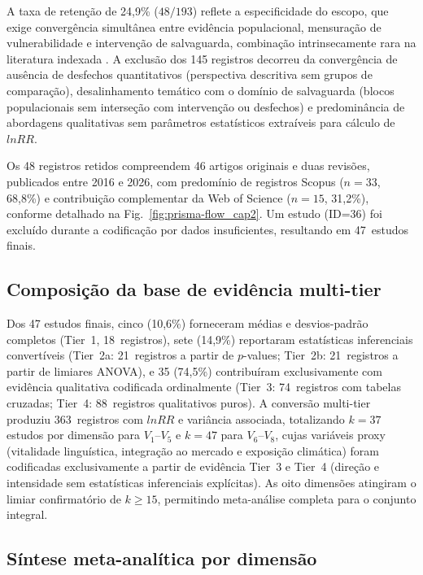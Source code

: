 A taxa de retenção de 24,9\% ($48/193$) reflete a especificidade do escopo, que exige convergência simultânea entre evidência populacional, mensuração de vulnerabilidade e intervenção de salvaguarda, combinação intrinsecamente rara na literatura indexada \cite{Agrawal2002,GomezBaggethun2013}. A exclusão dos 145 registros decorreu da convergência de ausência de desfechos quantitativos (perspectiva descritiva sem grupos de comparação), desalinhamento temático com o domínio de salvaguarda (blocos populacionais sem interseção com intervenção ou desfechos) e predominância de abordagens qualitativas sem parâmetros estatísticos extraíveis para cálculo de $lnRR$.

Os 48 registros retidos compreendem 46 artigos originais e duas revisões, publicados entre 2016 e 2026, com predomínio de registros Scopus ($n = 33$, 68,8\%) e contribuição complementar da Web of Science ($n = 15$, 31,2\%), conforme detalhado na Fig.~\ref{fig:prisma-flow_cap2}. Um estudo (ID=36) foi excluído durante a codificação por dados insuficientes, resultando em 47~estudos finais.

\subsection{Composição da base de evidência multi-tier}
\label{sec:tier-composition_cap2}

Dos 47 estudos finais, cinco (10,6\%) forneceram médias e desvios-padrão completos (Tier~1, 18~registros), sete (14,9\%) reportaram estatísticas inferenciais convertíveis (Tier~2a: 21~registros a partir de $p$-values; Tier~2b: 21~registros a partir de limiares ANOVA), e 35 (74,5\%) contribuíram exclusivamente com evidência qualitativa codificada ordinalmente (Tier~3: 74~registros com tabelas cruzadas; Tier~4: 88~registros qualitativos puros). A conversão multi-tier produziu 363~registros com $lnRR$ e variância associada, totalizando $k = 37$ estudos por dimensão para $V_1$--$V_5$ e $k = 47$ para $V_6$--$V_8$, cujas variáveis proxy (vitalidade linguística, integração ao mercado e exposição climática) foram codificadas exclusivamente a partir de evidência Tier~3 e Tier~4 (direção e intensidade sem estatísticas inferenciais explícitas). As oito dimensões atingiram o limiar confirmatório de $k \geq 15$, permitindo meta-análise completa para o conjunto integral.

\subsection{Síntese meta-analítica por dimensão}
\label{sec:meta-results_cap2}

